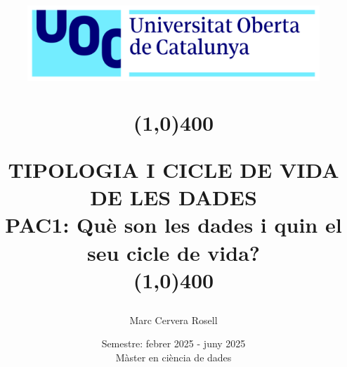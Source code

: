 \title{
	\begin{center}
	\vspace{3cm}
	\includegraphics[width=11cm, height=3cm]{images/Logo-uoc.png}
	\end{center}
	\begin{center}
	\line(1,0){400}
	\end{center}		
	TIPOLOGIA I CICLE DE VIDA DE LES DADES\\
	\vspace{2mm}
	\Large PAC1: Què son les dades i quin el seu cicle de vida?\\
	\line(1,0){400}
	\vspace{2.5cm}
	}

\author{Marc Cervera Rosell \vspace{1cm}}


\date{Semestre: febrer 2025 - juny 2025\vspace{0.5cm} \\ Màster en ciència de dades}